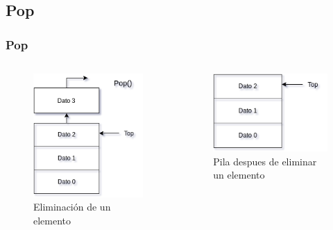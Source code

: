 \documentclass{beamer}
\begin{document}
\subsection{Pop}
\begin{frame}
    \frametitle{Pop}
    
    \begin{columns}[b]
    \begin{figure}
    \includegraphics[width =0.8 \textwidth]{images/pop1}
    \caption{Eliminación de un elemento}
    \end{figure}
   
    \begin{figure}
    \includegraphics[width =0.8 \textwidth]{images/pop2}
    \caption{Pila despues de eliminar un elemento}
    \end{figure}
   \end{columns}
    
\end{frame}
\end{document}
